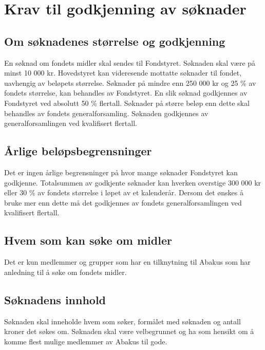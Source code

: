 \section{Krav til godkjenning av søknader}
\subsection{Om søknadenes størrelse og godkjenning}
En søknad om fondets midler skal sendes til Fondstyret. Søknaden skal være
på minst 10 000 kr. Hovedstyret kan videresende mottatte søknader til fondet,
uavhengig av beløpets størrelse. Søknader på mindre enn 250 000 kr og 25 \% av
fondets størrelse, kan behandles av Fondstyret. En slik søknad godkjennes av
Fondstyret ved absolutt 50 \% flertall. Søknader på
større beløp enn dette skal behandles av fondets generalforsamling. Søknaden
godkjennes av generalforsamlingen ved kvalifisert flertall.

\subsection{Årlige beløpsbegrensninger}
Det er ingen årlige begrensninger på hvor mange søknader Fondstyret kan
godkjenne. Totalsummen av godkjente søknader kan hverken overstige 300 000 kr
eller 30 \% av fondets størrelse i løpet av et kalenderår. Dersom det ønskes å
bruke mer enn dette må det godkjennes av fondets generalforsamlingen ved
kvalifisert flertall.

\subsection{Hvem som kan søke om midler}
Det er kun medlemmer og  grupper som har en tilknytning til Abakus som har
anledning til å søke om fondets midler.

\subsection{Søknadens innhold}
Søknaden skal inneholde hvem som søker, formålet med søknaden og antall kroner
det søkes om. Søknaden skal være velbegrunnet og ha som hensikt om å komme
flest mulige medlemmer av Abakus til gode.
